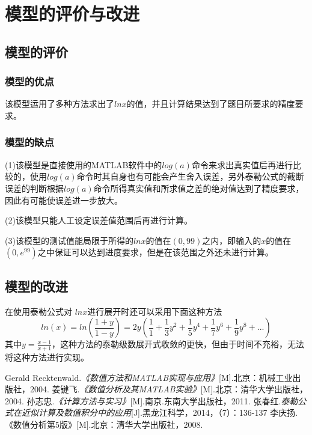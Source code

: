 \documentclass[UTF8]{ctexart}
\begin{document}
	\section{模型的评价与改进} %
		\subsection{模型的评价} %
			\subsubsection{模型的优点} %
	\par{该模型运用了多种方法求出了$lnx$的值，并且计算结果达到了题目所要求的精度要求。}
			\subsubsection{模型的缺点} %
	\par{(1)该模型是直接使用的MATLAB软件中的$log(a)$命令来求出真实值后再进行比较的，使用$log(a)$命令时其自身也有可能会产生舍入误差，另外泰勒公式的截断误差的判断根据$log(a)$命令所得真实值和所求值之差的绝对值达到了精度要求，因此有可能使误差进一步放大。}
	\par{(2)该模型只能人工设定误差值范围后再进行计算。}
	\par{(3)该模型的测试值能局限于所得的$lnx$的值在$(0,99)$之内，即输入的$x$的值在$(0,e^{99})$之中保证可以达到进度要求，但是在该范围之外还未进行计算。}
		\subsection{模型的改进} %
		\par{在使用泰勒公式对 $lnx$进行展开时还可以采用下面这种方法
			$$ ln(x)=ln(\frac{1+y}{1-y})= 2y(\frac{1}{1}+\frac{1}{3}y^2+\frac{1}{5}y^4    +\frac{1}{7}y^6+\frac{1}{9}y^8+... )$$
		其中$y=\frac{x-1}{x+1} $，这种方法的泰勒级数展开式收敛的更快，但由于时间不充裕，无法将这种方法进行实现。}

	\begin{thebibliography}{99}
		 Gerald Recktenwald.\emph{《数值方法和MATLAB实现与应用》}[M].北京：机械工业出版社，2004.
		 姜键飞.\emph{《数值分析及其MATLAB实验》}[M].北京：清华大学出版社，2004.
		 孙志忠.\emph{《计算方法与实习》}[M].南京.东南大学出版社，2011.
		 张春红.\emph{泰勒公式在近似计算及数值积分中的应用}[J].黑龙江科学，2014，（7）：136-137
		 李庆扬.《数值分析第5版》[M].北京：清华大学出版社，2008.
	\end{thebibliography}
	
	
	
	
\end{document}
